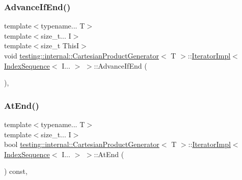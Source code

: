 \subsubsection{\texorpdfstring{AdvanceIfEnd()}{AdvanceIfEnd()}\hspace{0.1cm}{\footnotesize\ttfamily [2/2]}}
{\footnotesize\ttfamily template$<$typename... T$>$ \\
template$<$size\+\_\+t... I$>$ \\
template$<$size\+\_\+t ThisI$>$ \\
void \mbox{\hyperlink{classtesting_1_1internal_1_1_cartesian_product_generator}{testing\+::internal\+::\+Cartesian\+Product\+Generator}}$<$ T $>$\+::\mbox{\hyperlink{classtesting_1_1internal_1_1_cartesian_product_generator_1_1_iterator_impl}{Iterator\+Impl}}$<$ \mbox{\hyperlink{structtesting_1_1internal_1_1_index_sequence}{Index\+Sequence}}$<$ I... $>$ $>$\+::Advance\+If\+End (\begin{DoxyParamCaption}{ }\end{DoxyParamCaption})\hspace{0.3cm}{\ttfamily [inline]}, {\ttfamily [private]}}

\mbox{\label{classtesting_1_1internal_1_1_cartesian_product_generator_1_1_iterator_impl_3_01_index_sequence_3_01_i_8_8_8_01_4_01_4_abdf53ad1a435b992d399210178b35b70}} 
\subsubsection{\texorpdfstring{AtEnd()}{AtEnd()}\hspace{0.1cm}{\footnotesize\ttfamily [1/2]}}
{\footnotesize\ttfamily template$<$typename... T$>$ \\
template$<$size\+\_\+t... I$>$ \\
bool \mbox{\hyperlink{classtesting_1_1internal_1_1_cartesian_product_generator}{testing\+::internal\+::\+Cartesian\+Product\+Generator}}$<$ T $>$\+::\mbox{\hyperlink{classtesting_1_1internal_1_1_cartesian_product_generator_1_1_iterator_impl}{Iterator\+Impl}}$<$ \mbox{\hyperlink{structtesting_1_1internal_1_1_index_sequence}{Index\+Sequence}}$<$ I... $>$ $>$\+::At\+End (\begin{DoxyParamCaption}{ }\end{DoxyParamCaption}) const\hspace{0.3cm}{\ttfamily [inline]}, {\ttfamily [private]}}

